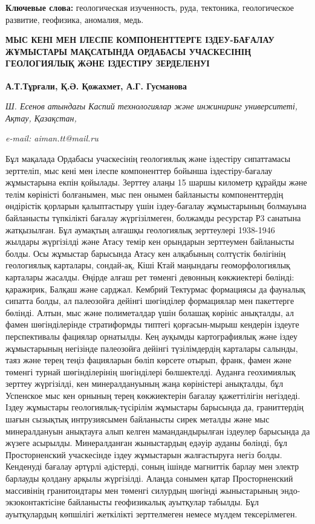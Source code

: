 {\bfseries Ключевые слова:} геологическая изученность, руда, тектоника,
геологическое развитие, геофизика, аномалия, медь.

\begin{articleheader}
{\bfseries МЫС КЕНІ МЕН ІЛЕСПЕ КОМПОНЕНТТЕРГЕ ІЗДЕУ-БАҒАЛАУ ЖҰМЫСТАРЫ МАҚСАТЫНДА ОРДАБАСЫ УЧАСКЕСІНІҢ ГЕОЛОГИЯЛЫҚ ЖӘНЕ ІЗДЕСТІРУ ЗЕРДЕЛЕНУІ}

{\bfseries
А.Т.Тұрғали\textsuperscript{\envelope },
Қ.Ә. Қожахмет,
А.Г. Гусманова}
\end{articleheader}

\begin{affiliation}
\emph{Ш. Есенов атындағы Каспий технологиялар және инжиниринг университеті, Ақтау, Қазақстан,}

\emph{e-mail: aiman.tt@mail.ru}
\end{affiliation}

Бұл мақалада Ордабасы учаскесінің геологиялық және іздестіру сипаттамасы
зерттеліп, мыс кені мен ілеспе компоненттер бойынша іздестіру-бағалау
жұмыстарына екпін қойылады. Зерттеу алаңы 15 шаршы километр құрайды және
телім көріністі болғанымен, мыс пен онымен байланысты компоненттердің
өндірістік қорларын қалыптастыру үшін іздеу-бағалау жұмыстарының
болмауына байланысты түпкілікті бағалау жүргізілмеген, болжамды
ресурстар Р3 санатына жатқызылған. Бұл аумақтың алғашқы геологиялық
зерттеулері 1938-1946 жылдары жүргізілді және Атасу темір кен орындарын
зерттеумен байланысты болды. Осы жұмыстар барысында Атасу кен алқабының
солтүстік бөлігінің геологиялық карталары, сондай-ақ, Кіші Ктай
маңындағы геоморфологиялық карталары жасалды. Өңірде алғаш рет төменгі
девонның көкжиектері бөлінді: қаражирик, Балқаш және сарджал. Кембрий
Тектурмас формациясы да фауналық сипатта болды, ал палеозойға дейінгі
шөгінділер формациялар мен пакеттерге бөлінді. Алтын, мыс және
полиметалдар үшін болашақ көрініс анықталды, ал фамен шөгінділерінде
стратиформды типтегі қорғасын-мырыш кендерін іздеуге перспективалы
фациялар орнатылды. Кең ауқымды картографиялық және іздеу жұмыстарының
негізінде палеозойға дейінгі түзілімдердің карталары салынды, таяз және
терең теңіз фацияларын бөліп көрсете отырып, франк, фамен және төменгі
турнай шөгінділерінің шөгінділері бөлшектелді. Ауданға геохимиялық
зерттеу жүргізілді, кен минералдануының жаңа көріністері анықталды, бұл
Успенское мыс кен орнының терең көкжиектерін бағалау қажеттілігін
негіздеді. Іздеу жұмыстары геологиялық-түсірілім жұмыстары барысында да,
граниттердің шағын сызықтық интрузиясымен байланысты сирек металды және
мыс минералдануын анықтауға алып келген мамандандырылған іздеулер
барысында да жүзеге асырылды. Минералданған жыныстардың едәуір ауданы
бөлінді, бұл Просторненский учаскесінде іздеу жұмыстарын жалғастыруға
негіз болды. Кенденуді бағалау әртүрлі әдістерді, соның ішінде магниттік
барлау мен электр барлауды қолдану арқылы жүргізілді. Алаңда сонымен
қатар Просторненский массивінің гранитоидтары мен төменгі силурдың
шөгінді жыныстарының эндо-экзоконтактісіне байланысты геофизикалық
ауытқулар табылды. Бұл ауытқулардың көпшілігі жеткілікті зерттелмеген
немесе мүлдем тексерілмеген.

